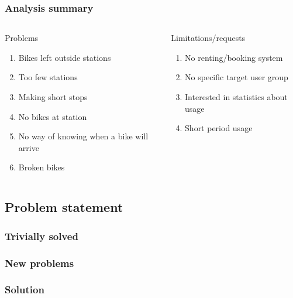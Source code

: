 \begin{frame}
\frametitle{Analysis summary}
\begin{columns}
\begin{column}{.45\textwidth}
\begin{block}{Problems\footnotemark}
\begin{enumerate}
\item Bikes left outside stations
\item Too few stations
\item Making short stops
\item No bikes at station
\item No way of knowing when a bike will arrive
\item Broken bikes
\end{enumerate}
\end{block}
\end{column}
\begin{column}{.45\textwidth}
\begin{block}{Limitations/requests\footnotemark[1]}
\begin{enumerate}
\item No renting/booking system
\item No specific target user group
\item Interested in statistics about usage
\item Short period usage
\end{enumerate}
\end{block}
\end{column}
\end{columns}
\end{frame}

\subsection{Problem statement}

\begin{frame}
\frametitle{Trivially solved}

\end{frame}

\begin{frame}
\frametitle{New problems}

\end{frame}

\begin{frame}
\frametitle{Solution}

\end{frame}